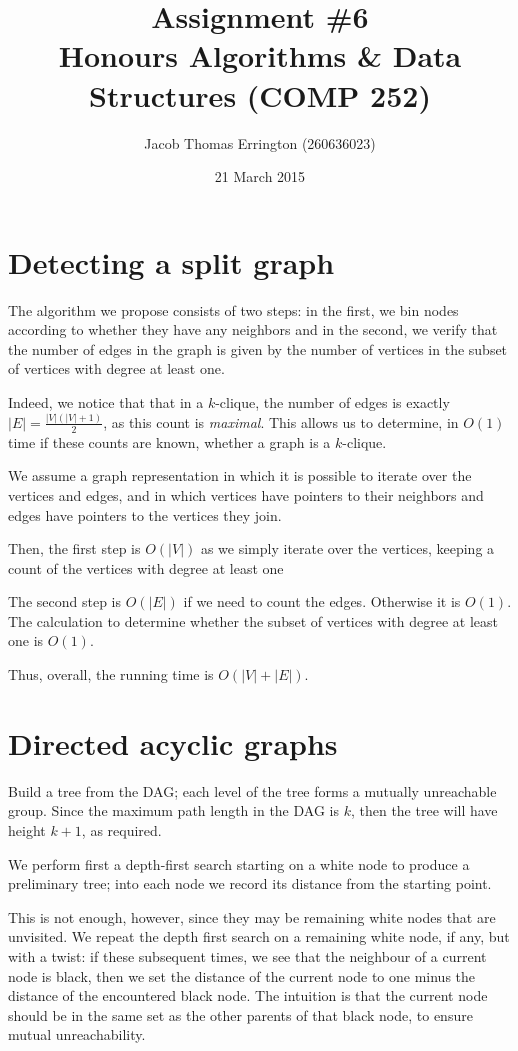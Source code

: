 \documentclass{article}
\title{Assignment \#6\\Honours Algorithms & Data Structures (COMP 252)}
\author{Jacob Thomas Errington (260636023)}
\date{21 March 2015}
\begin{document}
\maketitle

\section{Detecting a split graph}

The algorithm we propose consists of two steps: in the first, we bin nodes according to whether they have any neighbors and in the second, we verify that the number of edges in the graph is given by the number of vertices in the subset of vertices with degree at least one.

Indeed, we notice that that in a $k$-clique, the number of edges is exactly $|E| = \frac{|V|(|V| + 1)}{2}$, as this count is \emph{maximal}. This allows us to determine, in $O(1)$ time if these counts are known, whether a graph is a $k$-clique.

We assume a graph representation in which it is possible to iterate over the vertices and edges, and in which vertices have pointers to their neighbors and edges have pointers to the vertices they join.

Then, the first step is $O(|V|)$ as we simply iterate over the vertices, keeping a count of the vertices with degree at least one

The second step is $O(|E|)$ if we need to count the edges. Otherwise it is $O(1)$. The calculation to determine whether the subset of vertices with degree at least one is $O(1)$.

Thus, overall, the running time is $O(|V| + |E|)$.

\section{Directed acyclic graphs}

Build a tree from the DAG; each level of the tree forms a mutually unreachable group. Since the maximum path length in the DAG is $k$, then the tree will have height $k+1$, as required.

We perform first a depth-first search starting on a white node to produce a preliminary tree; into each node we record its distance from the starting point.

This is not enough, however, since they may be remaining white nodes that are unvisited. We repeat the depth first search on a remaining white node, if any, but with a twist: if these subsequent times, we see that the neighbour of a current node is black, then we set the distance of the current node to one minus the distance of the encountered black node. The intuition is that the current node should be in the same set as the other parents of that black node, to ensure mutual unreachability.
\end{document}
